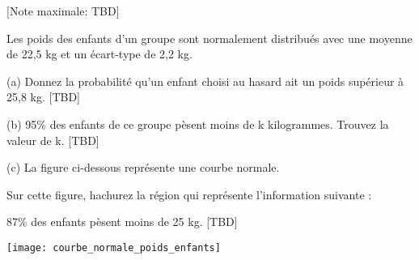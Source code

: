 \begin{question}
  \medskip
  \hspace*{\fill} [Note maximale: TBD]\par
  \medskip
  \noindent Les poids des enfants d’un groupe sont normalement distribués avec une moyenne de 22,5 kg
  et un écart-type de 2,2 kg.\par
  \medskip  

  (a) Donnez la probabilité qu’un enfant choisi au hasard ait un poids supérieur à 25,8 kg.\hspace*{\fill} [TBD]\par
  \medskip  

  (b) 95\% des enfants de ce groupe pèsent moins de k kilogrammes. Trouvez la valeur de k.\hspace*{\fill} [TBD]\par
  \medskip  

  (c) La figure ci-dessous représente une courbe normale.\par
  \hspace{1em}Sur cette figure, hachurez la région qui représente l’information suivante :\par
  \hspace{1em}87\% des enfants pèsent moins de 25 kg.\hspace*{\fill} [TBD]\par
  \medskip
  \texttt{[image: courbe\_normale\_poids\_enfants]}\par  
  \medskip
\end{question}


